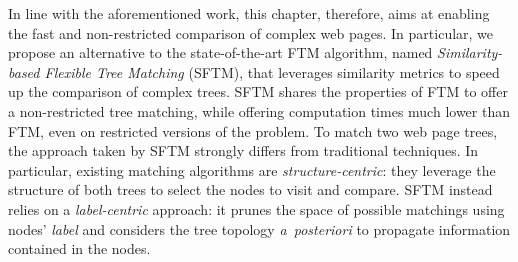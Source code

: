 



In line with the aforementioned work, this chapter, therefore, aims at enabling the fast and non-restricted comparison of complex web pages.
In particular, we propose an alternative to the state-of-the-art FTM algorithm, named \emph{Similarity-based Flexible Tree Matching} (SFTM), that leverages similarity metrics to speed up the comparison of complex trees. 
SFTM shares the properties of FTM to offer a non-restricted tree matching, while offering computation times much lower than FTM, even on restricted versions of the problem.
To match two web page trees, the approach taken by SFTM strongly differs from traditional techniques.
In particular, existing matching algorithms are \textit{structure-centric}: they leverage the structure of both trees to select the nodes to visit and compare.
SFTM instead relies on a \textit{label-centric} approach: it prunes the space of possible matchings using nodes' \emph{label} and considers the tree topology \emph{a~posteriori} to propagate information contained in the nodes.


